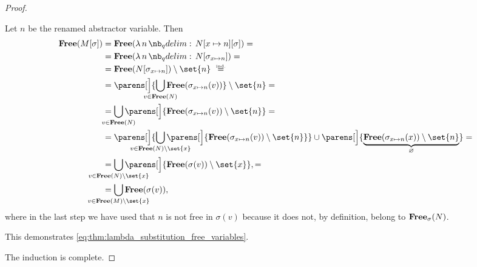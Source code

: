 \begin{proof}
\begin{itemize}
\begin{itemize}
      Let \( n \) be the renamed abstractor variable. Then
      \begin{align*}
        \op*{Free}(M[\sigma])
        &=
        \op*{Free}(\qabs n N[x \mapsto n][\sigma])
        = \\ &=
        \op*{Free}(\qabs n N[\sigma_{x \mapsto n}])
        = \\ &=
        \op*{Free}(N[\sigma_{x \mapsto n}]) \setminus \set{ n }
        \reloset {\T{ind.}} = \\ &=
        \parens[\Big]{ \bigcup_{\mathclap{v \in \op*{Free}(N)}} \op*{Free}(\sigma_{x \mapsto n}(v)) } \setminus \set{ n }
        = \\ &=
        \bigcup_{\mathclap{v \in \op*{Free}(N)}} \parens[\Big]{ \op*{Free}(\sigma_{x \mapsto n}(v)) \setminus \set{ n } }
        = \\ &=
        \parens[\Big]{ \bigcup_{\mathclap{v \in \op*{Free}(N) \setminus \set{ x }}} \parens[\Big]{ \op*{Free}(\sigma_{x \mapsto n}(v)) \setminus \set{ n } } } \cup \parens[\Big]{ \underbrace{\op*{Free}(\sigma_{x \mapsto n}(x)) \setminus \set{ n }}_\varnothing }
        = \\ &=
        \bigcup_{\mathclap{v \in \op*{Free}(N) \setminus \set{ x }}} \parens[\Big]{ \op*{Free}(\sigma(v)) \setminus \set{ x } },
        = \\ &=
        \bigcup_{\mathclap{v \in \op*{Free}(M) \setminus \set{ x }}} \op*{Free}(\sigma(v)),
      \end{align*}
      where in the last step we have used that \( n \) is not free in \( \sigma(v) \) because it does not, by definition, belong to \( \op*{Free}_\sigma(N) \).

      This demonstrates \eqref{eq:thm:lambda_substitution_free_variables}.
    \end{itemize}
  \end{itemize}

  The induction is complete.
\end{proof}

